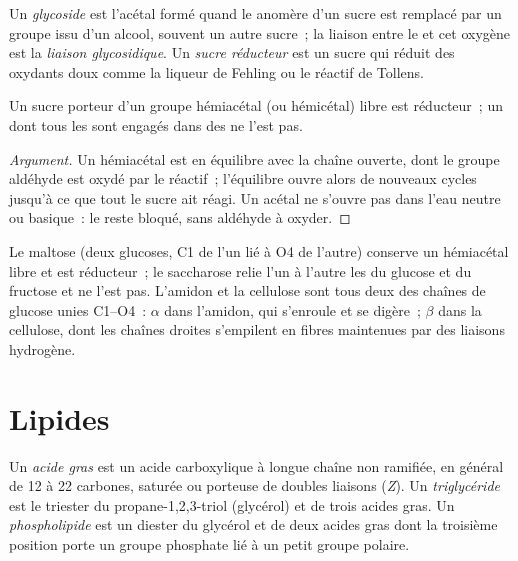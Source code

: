 \begin{definition}[Glycosides]\label{def:b2:biomolecules:glycoside}
Un \emph{glycoside} est l'acétal formé quand le  anomère d'un sucre est remplacé
par un groupe  issu d'un alcool, souvent un autre sucre~; la liaison entre le  et
cet oxygène est la \emph{liaison glycosidique}. Un \emph{sucre
réducteur} est un sucre qui réduit des oxydants doux comme la
liqueur de Fehling ou le réactif de Tollens.
\end{definition}

\begin{proposition}\label{prop:b2:biomolecules:reducing}
Un sucre porteur d'un groupe hémiacétal (ou hémicétal) libre est réducteur~; un  dont tous les
 sont engagés dans des  ne l'est pas.
\end{proposition}

\begin{proof}[Argument]
Un hémiacétal est en équilibre avec la chaîne ouverte, dont le groupe aldéhyde est oxydé par le
réactif~; l'équilibre ouvre alors de nouveaux cycles jusqu'à ce que tout le sucre ait réagi. Un acétal ne
s'ouvre pas dans l'eau neutre ou basique~: le  reste bloqué, sans aldéhyde à oxyder.
\end{proof}

Le maltose (deux glucoses, C1 de l'un lié à O4 de l'autre) conserve un hémiacétal libre et est
réducteur~; le saccharose relie l'un à l'autre les  du glucose et du fructose et ne
l'est pas. L'amidon et la cellulose sont tous deux des chaînes de glucose unies C1--O4~: $\alpha$ dans
l'amidon, qui s'enroule et se digère~; $\beta$ dans la cellulose, dont les chaînes droites s'empilent en
fibres maintenues par des liaisons hydrogène.

\section{Lipides}

\begin{definition}[Lipides]\label{def:b2:biomolecules:lipid}
Un \emph{acide gras} est un acide carboxylique à longue chaîne non ramifiée, en
général de 12 à 22 carbones, saturée ou porteuse de doubles liaisons (\textit{Z}). Un
\emph{triglycéride} est le triester du propane-1,2,3-triol (glycérol)
et de trois acides gras. Un \emph{phospholipide} est un diester du glycérol et de
deux acides gras dont la troisième position porte un groupe phosphate lié à un petit groupe polaire.
\end{definition}

